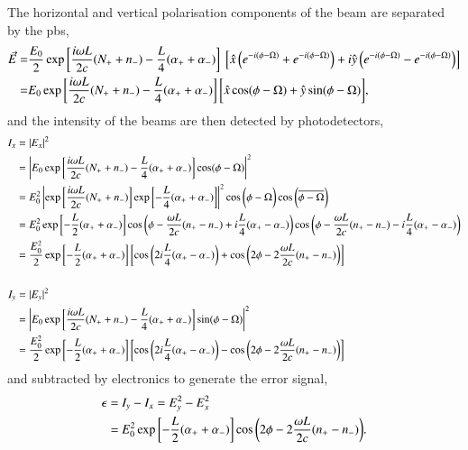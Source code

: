 The horizontal and vertical polarisation components of the beam are separated by the \gls{pbs},
\begin{align}
\vec{E} = &\frac{E_0}{2} \exp\left[\frac{i\omega L}{2c}(N_+ + n_-) - \frac{L}{4}(\alpha_++\alpha_-)\right]\ \left[ \hat{x} \left(e^{-i(\phi-\Omega)}+e^{-i(\phi-\Omega)}\right) + i\hat{y} \left(e^{-i(\phi-\Omega)}-e^{-i(\phi-\Omega)}\right)\right]\notag\\
 = & E_0 \exp\left[\frac{i\omega L}{2c}(N_+ + n_-) - \frac{L}{4}(\alpha_++\alpha_-)\right] \bigg[ \hat{x} \cos(\phi-\Omega) + \hat{y} \sin(\phi-\Omega)\bigg],
\end{align}
and the intensity of the beams are then detected by photodetectors,
\begin{align}
I_x &= |E_x|^2 \notag \\
& = \left|E_0 \exp\left[\frac{i\omega L}{2c}(N_+ + n_-) - \frac{L}{4}(\alpha_++\alpha_-)\right] \cos(\phi-\Omega) \right|^2 \notag \\
& = E_0^2\left| \exp\left[\frac{i\omega L}{2c}(N_+ + n_-)\right]\exp\left[-\frac{L}{4}(\alpha_++\alpha_-)\right] \right|^2 \cos\bigg(\phi-\Omega\bigg) \cos\bigg(\overline{\phi-\Omega}\bigg) \notag \\
& = E_0^2 \exp\left[-\frac{L}{2}(\alpha_++\alpha_-)\right] \cos\bigg(\phi-\frac{\omega L}{2c}(n_+-n_-) + i\frac{L}{4}(\alpha_+ -\alpha_-)\bigg) \cos\bigg(\phi-\frac{\omega L}{2c}(n_+-n_-) - i\frac{L}{4}(\alpha_+ -\alpha_-)\bigg) \notag \\
& = \frac{E_0^2}{2} \exp\left[-\frac{L}{2}(\alpha_++\alpha_-)\right] \left[\cos\bigg(2i\frac{L}{4}(\alpha_+ -\alpha_-)\bigg) + \cos\bigg(2\phi-2\frac{\omega L}{2c}(n_+-n_-)\bigg)\right] \\
\notag\\
I_y &= |E_y|^2 \notag \\
& = \left|E_0 \exp\left[\frac{i\omega L}{2c}(N_+ + n_-) - \frac{L}{4}(\alpha_++\alpha_-)\right] \sin(\phi-\Omega) \right|^2 \notag \\
& = \frac{E_0^2}{2} \exp\left[-\frac{L}{2}(\alpha_++\alpha_-)\right] \left[\cos\bigg(2i\frac{L}{4}(\alpha_+ -\alpha_-)\bigg) - \cos\bigg(2\phi-2\frac{\omega L}{2c}(n_+-n_-)\bigg)\right]
\end{align}
and subtracted by electronics to generate the error signal,
\begin{align}
\epsilon =\ &I_y - I_x = E_y^2 - E_x^2 \notag \\
=\ &E_0^2 \exp\left[-\frac{L}{2}(\alpha_++\alpha_-)\right] \cos\bigg(2\phi-2\frac{\omega L}{2c}(n_+-n_-)\bigg).
\end{align}

